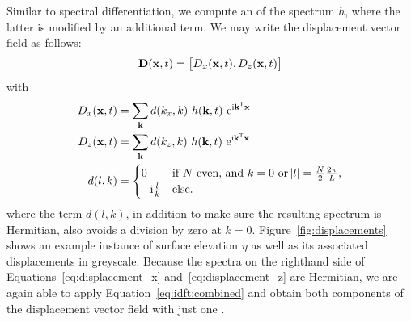 Similar to spectral differentiation, we compute an \InvFourierTransform of the spectrum $h$,
where the latter is modified by an additional term. We may write the displacement vector field as follows:
\begin{equation}
 \mathbf{D}(\mathbf{x},t) = \left[D_x(\mathbf{x},t), D_z(\mathbf{x},t)\right]
\end{equation}
with
\begin{align}
\label{eq:displacement_x} D_x(\mathbf{x},t) &= \sum_{\mathbf{k}}d(k_x, 
k)~h(\mathbf{k},t)~\mathrm{e}^{\mathrm{i}\mathbf{k}^{\mathsf{T}}\mathbf{x}} \\
\label{eq:displacement_z} D_z(\mathbf{x},t) &= \sum_{\mathbf{k}}d(k_z, 
k)~h(\mathbf{k},t)~\mathrm{e}^{\mathrm{i}\mathbf{k}^{\mathsf{T}}\mathbf{x}} \\
 d(l, k) &= \begin{cases}
             0 &\text{if $N$ even, and $k = 0$ or $\abs{l} = 
\frac{N}{2}\frac{2\pi}{L}$,} \\
             -\mathrm{i}\frac{l}{k} &\text{else.}
            \end{cases}
\end{align}
where the term $d(l, k)$, in addition to make sure the resulting spectrum is 
Hermitian, also avoids a division by zero at $k = 0$. 
Figure~\ref{fig:displacements} shows an example instance of surface elevation 
$\eta$ as well as its associated displacements in greyscale.
Because the spectra on the righthand side of Equations~\ref{eq:displacement_x} 
and~\ref{eq:displacement_z} are Hermitian, we are again able to apply 
Equation~\ref{eq:idft:combined} and obtain both components of the displacement 
vector field with just one \InvFourierTransform.


